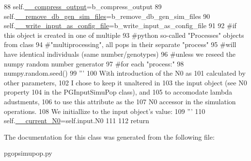 \begin{DoxyCode}
88         self.\hyperlink{classnegui_1_1pgopsimupop_1_1PGOpSimuPop_acccf36393e66057c8026cba0557d3fb8}{\_\_compress\_output}=b\_compress\_output
89         self.\hyperlink{classnegui_1_1pgopsimupop_1_1PGOpSimuPop_a5a64b272404e6113dd1c7ba70235c366}{\_\_remove\_db\_gen\_sim\_files}=b\_remove\_db\_gen\_sim\_files
90         self.\hyperlink{classnegui_1_1pgopsimupop_1_1PGOpSimuPop_a9a27655cf00df0e11603e221c314c0a9}{\_\_write\_input\_as\_config\_file}=b\_write\_input\_as\_config\_file
91 
92         \textcolor{comment}{#if this object is created in one of multiple}
93         \textcolor{comment}{#python so-called "Processes" objects from class}
94         \textcolor{comment}{#"multiprocessing", all pops in their separate "process"}
95         \textcolor{comment}{#will have identical individuals (same number/genotypes) }
96         \textcolor{comment}{#unless we reseed the numpy random number generator }
97         \textcolor{comment}{#for each "process:"}
98         numpy.random.seed()
99         \textcolor{stringliteral}{'''}
100 \textcolor{stringliteral}{        With introduction of the N0 as }
101 \textcolor{stringliteral}{        calculated by other parameters,}
102 \textcolor{stringliteral}{        I chose to keep it unaltered in }
103 \textcolor{stringliteral}{        the input object (see N0 property}
104 \textcolor{stringliteral}{        in the PGInputSimuPop class), and}
105 \textcolor{stringliteral}{        to accomodate lambda adustments,}
106 \textcolor{stringliteral}{        to use this attribute as the }
107 \textcolor{stringliteral}{        N0 accessor in the simulation operations.}
108 \textcolor{stringliteral}{        We initiallize to the input object's value:}
109 \textcolor{stringliteral}{        '''}
110         self.\hyperlink{classnegui_1_1pgopsimupop_1_1PGOpSimuPop_a2f0c7a20605eb636fd7624e0472b58ed}{\_\_current\_N0}=self.input.N0
111         
112         \textcolor{keywordflow}{return}
\end{DoxyCode}


The documentation for this class was generated from the following file\+:\begin{DoxyCompactItemize}
\item 
pgopsimupop.\+py\end{DoxyCompactItemize}
